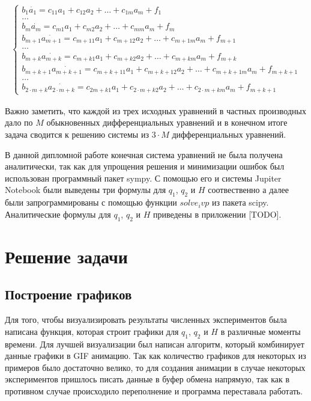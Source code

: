 \documentclass[14pt]{extreport}
\begin{document}
\begin{eqnarray}
\begin{cases}
b_1 \dot{a_{1}} = c_{11} a_1 + c_{12} a_2 + \dots + c_{1m} a_m + f_1 \\
\dots \\
b_m \dot{a_{m}} = c_{m1} a_1 + c_{m2} a_2 + \dots + c_{mm} a_m + f_m\\
b_{m+1} \dot{a_{m+1}} = c_{{m+1}1} a_1 + c_{{m+1}2} a_2 + \dots + c_{{m+1}m} a_m + f_{m+1} \\
\dots \\
b_{m+k} \dot{a_{m+k}} = c_{{m+k}1} a_1 + c_{{m+k}2} a_2 + \dots + c_{{m+k}m} a_m + f_{m+k} \\
b_{m+k+1} \dot{a_{m+k+1}} = c_{{m+k+1}1} a_1 + c_{{m+k+1}2} a_2 + \dots + c_{{m+k+1}m} a_m + f_{m+k+1} \\
\dots \\
b_{2\cdot m + k} \dot{a_{2\cdot m + k}} = c_{{2m + k}1} a_1 + c_{{2\cdot m + k}2} a_2 + \dots + c_{{2\cdot m + k}m} a_m + f_{m+k+1}
\end{cases}
\end{eqnarray}

Важно заметить, что каждой из трех исходных уравнений в частных производных дало по $M$ обыкновенных дифференциальных уравнений и в конечном итоге задача сводится к решению системы из $3\cdot M$ дифференциальных уравнений.

В данной дипломной работе конечная система уравнений не была получена аналитически, так как для упрощения решения и минимизации ошибок был использован программный пакет sympy. С помощью его и системы Jupiter Notebook были выведены три формулы для $q_1$, $q_2$ и $H$ соотвественно а далее были запрограммированы с помощью функции $solve_ivp$ из пакета scipy. Аналитические формулы для $q_1$, $q_2$ и $H$ приведены в приложении [TODO].


\chapter{Решение задачи}

\section{Построение графиков}

Для того, чтобы визуализировать результаты численных экспериментов была написана функция, которая строит графики для $q_1$, $q_2$ и $H$ в различные моменты времени. Для лучшей визуализации был написан алгоритм, который комбинирует данные графики в GIF анимацию. Так как количество графиков для некоторых из примеров было достаточно велико, то для создания анимации в случае некоторых экспериментов пришлось писать данные в буфер обмена напрямую, так как в противном случае происходило переполнение и программа переставала работать.
\end{document}
